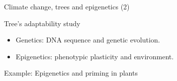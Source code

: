 \documentclass[11pt]{beamer}
\newcommand{\emphase}[1]{\textcolor{Complement}{#1}}
\begin{document}
	\begin{frame}{Climate change, trees and epigenetics (2)}
		\begin{block}{Tree's adaptability \emphase{study}}
			\begin{itemize}
				\item Genetics: DNA sequence and \emphase{genetic evolution}. 
				\item Epigenetics: \emphase{phenotypic plasticity} and environment.
			\end{itemize}
		\end{block}
		
		\begin{block}{\emphase{Example}: Epigenetics and priming in plants}
			
		\end{block}
	\end{frame}
	
\end{document}
